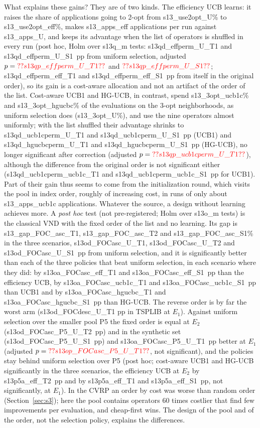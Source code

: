 What explains these gains? They are of two kinds. The efficiency UCB learns: it raises the share of applications going to 2-opt from \num{s13_use2opt_U}\% to \num{s13_use2opt_eff}\%, makes \num{s13_apps_eff} applications per run against \num{s13_apps_U}, and keeps its advantage when the list of operators is shuffled in every run (post hoc, Holm over \num{s13q_m} tests: \num{s13qd_effperm_U_T1} and \num{s13qd_effperm_U_S1}~pp from uniform selection, adjusted $p=\num{s13qp_effperm_U_T1}$ and $\num{s13qp_effperm_U_S1}$; \num{s13qd_effperm_eff_T1} and \num{s13qd_effperm_eff_S1}~pp from itself in the original order), so its gain is a cost-aware allocation and not an artifact of the order of the list. Cost-aware UCB1 and HG-UCB, in contrast, spend \num{s13_3opt_ucb1c}\% and \num{s13_3opt_hgucbc}\% of the evaluations on the 3-opt neighborhoods, as uniform selection does (\num{s13_3opt_U}\%), and use the nine operators almost uniformly; with the list shuffled their advantage shrinks to \num{s13qd_ucb1cperm_U_T1} and \num{s13qd_ucb1cperm_U_S1}~pp (UCB1) and \num{s13qd_hgucbcperm_U_T1} and \num{s13qd_hgucbcperm_U_S1}~pp (HG-UCB), no longer significant after correction (adjusted $p=\num{s13qp_ucb1cperm_U_T1}$), although the difference from the original order is not significant either (\num{s13qd_ucb1cperm_ucb1c_T1} and \num{s13qd_ucb1cperm_ucb1c_S1}~pp for UCB1). Part of their gain thus seems to come from the initialization round, which visits the pool in index order, roughly of increasing cost, in runs of only about \num{s13_apps_ucb1c} applications. Whatever the source, a design without learning achieves more. A \emph{post hoc} test (not pre-registered; Holm over \num{s13o_m} tests) is the classical VND with the fixed order of the list and no learning. Its gap is \num{s13_gap_FOC_asc_T1}, \num{s13_gap_FOC_asc_T2} and \num{s13_gap_FOC_asc_S1}\% in the three scenarios, \num{s13od_FOCasc_U_T1}, \num{s13od_FOCasc_U_T2} and \num{s13od_FOCasc_U_S1}~pp from uniform selection, and it is significantly better than each of the three policies that beat uniform selection, in each scenario where they did: by \num{s13oa_FOCasc_eff_T1} and \num{s13oa_FOCasc_eff_S1}~pp than the efficiency UCB, by \num{s13oa_FOCasc_ucb1c_T1} and \num{s13oa_FOCasc_ucb1c_S1}~pp than UCB1 and by \num{s13oa_FOCasc_hgucbc_T1} and \num{s13oa_FOCasc_hgucbc_S1}~pp than HG-UCB. The reverse order is by far the worst arm (\num{s13od_FOCdesc_U_T1} pp in TSPLIB at $E_1$). Against uniform selection over the smaller pool P5 the fixed order is equal at $E_2$ (\num{s13od_FOCasc_P5_U_T2}~pp) and in the synthetic set (\num{s13od_FOCasc_P5_U_S1}~pp) and \num{s13oa_FOCasc_P5_U_T1}~pp better at $E_1$ (adjusted $p=\num{s13op_FOCasc_P5_U_T1}$, not significant), and the policies stay behind uniform selection over P5 (post hoc; cost-aware UCB1 and HG-UCB significantly in the three scenarios, the efficiency UCB at $E_2$ by \num{s13p5a_eff_T2}~pp and by \num{s13p5a_eff_T1} and \num{s13p5a_eff_S1}~pp, not significantly, at $E_1$). In the CVRP an order by cost was worse than random order (Section~\ref{sec:s3}); here the pool contains operators 60 times costlier that find few improvements per evaluation, and cheap-first wins. The design of the pool and of the order, not the selection policy, explains the differences.

